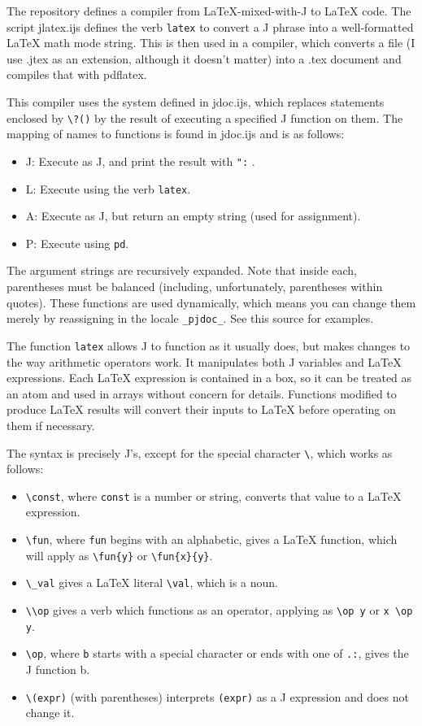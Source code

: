 \documentclass{article}
\newcommand{\code}[1]{\lstinline`#1`}
\begin{document}
The repository defines a compiler from LaTeX-mixed-with-J to LaTeX code.
The script jlatex.ijs defines the verb \code{latex} to convert a J phrase
into a well-formatted LaTeX math mode string.  This is then used in a
compiler, which converts a file (I use .jtex as an extension, although
it doesn't matter) into a .tex document and compiles that with pdflatex.

This compiler uses the system defined in jdoc.ijs, which replaces
statements enclosed by \code{\?()} by the result of executing a specified
J function on them. The mapping of names to functions is found in jdoc.ijs
and is as follows:
\begin{itemize}
  \item J: Execute as J, and print the result with \code{":} .
  \item L: Execute using the verb \code{latex}.
  \item A: Execute as J, but return an empty string (used for assignment).
  \item P: Execute using \code{pd}.
\end{itemize}
The argument strings are recursively expanded. Note that inside each,
parentheses must be balanced (including, unfortunately, parentheses
within quotes).
These functions are used dynamically, which means you can change them
merely by reassigning in the locale \code{_pjdoc_}. See this source for
examples.

The function \code{latex} allows J to function as it usually does, but
makes changes to the way arithmetic operators work.
It manipulates both J variables and LaTeX expressions.
Each LaTeX expression is contained in a box, so it can be treated as
an atom and used in arrays without concern for details.
Functions modified to produce LaTeX results will convert their inputs
to LaTeX before operating on them if necessary.

The syntax is precisely J's, except for the special character
\lstinline`\`, which works as follows:
\begin{itemize}
  \item \lstinline`\const`, where \code{const} is a number or string,
    converts that value to a LaTeX expression.
  \item \lstinline`\fun`, where \code{fun} begins with an alphabetic,
    gives a LaTeX function, which will apply as \lstinline`\fun{y}`
    or \lstinline`\fun{x}{y}`.
  \item \lstinline`\_val` gives a LaTeX literal \lstinline`\val`, which is a noun.
  \item \lstinline`\\op` gives a verb which functions as an operator,
    applying as \lstinline`\op y` or \lstinline`x \op y`.
  \item \lstinline`\op`, where \code{b} starts with a special character or
    ends with one of \code{.:}, gives the J function b.
  \item \lstinline`\(expr)` (with parentheses) interprets \code{(expr)}
    as a J expression and does not change it.
\end{itemize}
\end{document}
